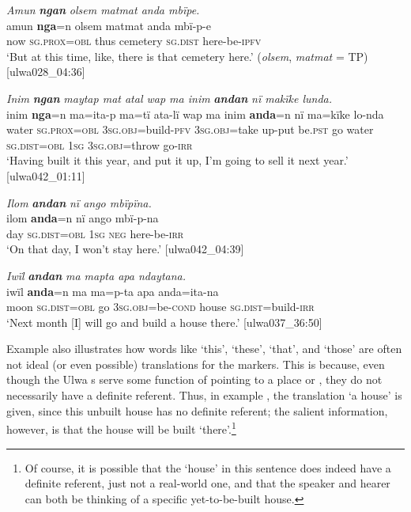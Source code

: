 \ea%
    \label{ex:det:103}
          \textit{Amun} \textbf{\textit{ngan}} \textit{olsem matmat anda mbïpe.}\\
\gll    amun  \textbf{nga}=n      olsem  matmat  anda    mbï-p-e\\
    now  \textsc{sg.prox=obl}  thus  cemetery  \textsc{sg.dist}  here-be\textsc{{}-ipfv}\\
\glt `But at this time, like, there is that cemetery here.’ (\textit{olsem}, \textit{matmat} = TP) [ulwa028\_04:36]
\z

\ea%
    \label{ex:det:104}
          \textit{Inim} \textbf{\textit{ngan}} \textit{maytap mat atal wap ma inim} \textbf{\textit{andan}} \textit{nï makïke lunda.}\\
\gll    inim  \textbf{nga}=n      ma=ita-p        ma=tï      ata-lï     wap  ma  inim  \textbf{anda}=n    nï    ma=kïke      lo-nda\\
    water  \textsc{sg.prox=obl}  \textsc{3sg.obj}=build-\textsc{pfv}  \textsc{3sg.obj}=take  up-put    be.\textsc{pst}  go  water  \textsc{sg.dist=obl}  1\textsc{sg}  3\textsc{sg.obj}=throw  go-\textsc{irr}\\
\glt `Having built it this year, and put it up, I’m going to sell it next year.’ [ulwa042\_01:11]
\z

\ea%
    \label{ex:det:105}
          \textit{Ilom} \textbf{\textit{andan}} \textit{nï ango mbïpïna.}\\
\gll    ilom  \textbf{anda}=n    nï    ango  mbï-p-na\\
    day    \textsc{sg.dist=obl}  1\textsc{sg}  \textsc{neg}  here-be-\textsc{irr}\\
\glt `On that day, I won’t stay here.’ [ulwa042\_04:39]
\z

\ea%
    \label{ex:det:106}
          \textit{Iwïl} \textbf{\textit{andan}} \textit{ma mapta apa ndaytana.}\\
\gll    iwïl  \textbf{anda}=n    ma  ma=p-ta      apa anda=ita-na\\
    moon  \textsc{sg.dist=obl}  go  \textsc{3sg.obj}=be\textsc{{}-cond} house    \textsc{sg.dist}=build-\textsc{irr}\\
\glt `Next month [I] will go and build a house there.’ [ulwa037\_36:50]
\z

Example  also illustrates how words like  ‘this’, ‘these’, ‘that’, and ‘those’ are often not ideal (or even possible) translations for the  markers. This is because, even though the Ulwa s serve some  function of pointing to a place or , they do not necessarily have a definite referent. Thus, in example , the translation ‘a house’ is given, since this unbuilt house has no definite referent; the salient information, however, is that the house will be built ‘there’.\footnote{Of course, it is possible that the ‘house’ in this sentence does indeed have a definite referent, just not a real-world one, and that the speaker and hearer can both be thinking of a specific yet-to-be-built house.}

